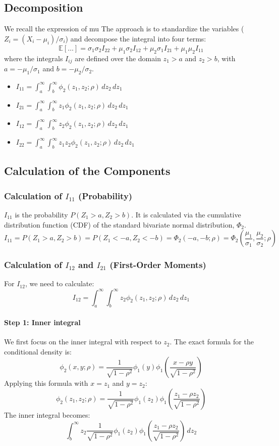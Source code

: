 \documentclass[11pt, a4paper]{article}
\newcommand{\E}{\mathbb{E}}
\newcommand{\dd}{\,d} %
\begin{document}
\subsection{Decomposition}
We recall the expression of mu
The approach is to standardize the variables ($Z_i = (X_i - \mu_i)/\sigma_i$) and decompose the integral into four terms:
\[
\E[\dots] = \sigma_1\sigma_2 I_{22} + \mu_1\sigma_2 I_{12} + \mu_2\sigma_1 I_{21} + \mu_1\mu_2 I_{11}
\]
where the integrals $I_{ij}$ are defined over the domain $z_1 > a$ and $z_2 > b$, with $a = -\mu_1/\sigma_1$ and $b = -\mu_2/\sigma_2$.
\begin{itemize}
    \item $I_{11} = \int_a^\infty \int_b^\infty \phi_2(z_1, z_2; \rho) \dd z_2 \dd z_1$
    \item $I_{21} = \int_a^\infty \int_b^\infty z_1 \phi_2(z_1, z_2; \rho) \dd z_2 \dd z_1$
    \item $I_{12} = \int_a^\infty \int_b^\infty z_2 \phi_2(z_1, z_2; \rho) \dd z_2 \dd z_1$
    \item $I_{22} = \int_a^\infty \int_b^\infty z_1 z_2 \phi_2(z_1, z_2; \rho) \dd z_2 \dd z_1$
\end{itemize}

\subsection{Calculation of the Components}

\subsubsection*{Calculation of $I_{11}$ (Probability)}
$I_{11}$ is the probability $P(Z_1 > a, Z_2 > b)$. It is calculated via the cumulative distribution function (CDF) of the standard bivariate normal distribution, $\Phi_2$.
\[
I_{11} = P(Z_1 > a, Z_2 > b) = P(Z_1 < -a, Z_2 < -b) = \Phi_2(-a, -b; \rho) = \Phi_2\left(\frac{\mu_1}{\sigma_1}, \frac{\mu_2}{\sigma_2}; \rho\right)
\]


\subsubsection*{Calculation of $I_{12}$ and $I_{21}$ (First-Order Moments)}

For $I_{12}$, we need to calculate:
\[
I_{12} = \int_a^\infty \int_b^\infty z_2 \phi_2(z_1, z_2; \rho) \dd z_2 \dd z_1
\]

\paragraph{Step 1: Inner integral}
We first focus on the inner integral with respect to $z_2$. The exact formula for the conditional density is:
\[
\phi_2(x,y;\rho) = \frac{1}{\sqrt{1-\rho^2}} \phi_1(y) \phi_1\left(\frac{x-\rho y}{\sqrt{1-\rho^2}}\right)
\]
Applying this formula with $x=z_1$ and $y=z_2$:
\[
\phi_2(z_1,z_2;\rho) = \frac{1}{\sqrt{1-\rho^2}} \phi_1(z_2) \phi_1\left(\frac{z_1-\rho z_2}{\sqrt{1-\rho^2}}\right)
\]
The inner integral becomes:
\[
\int_b^\infty z_2 \frac{1}{\sqrt{1-\rho^2}} \phi_1(z_2) \phi_1\left(\frac{z_1-\rho z_2}{\sqrt{1-\rho^2}}\right) \dd z_2
\]
\end{document}
